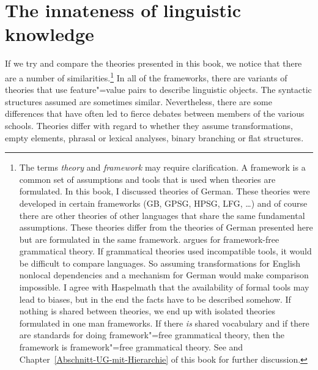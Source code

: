 %

\chapter{The innateness of linguistic knowledge}
\label{Abschnitt-Angeborenheit}\label{chap-innateness}
%


If we try and compare the theories presented in this book, we notice
that there are a number of similarities.\footnote{
  The terms \emph{theory} and \emph{framework} may require clarification. A framework is a common
  set of assumptions and tools that is used when theories are formulated. In this book, I discussed
  theories of German. These theories were developed in certain frameworks (GB, GPSG, HPSG, LFG, \ldots) and of course there are
  other theories of other languages that share the same fundamental assumptions. These theories
  differ from the theories of German presented here but are formulated in the same
  framework. \citet{Haspelmath2010c} argues for framework-free grammatical theory. If grammatical
  theories used incompatible tools, it would be difficult to compare languages. So assuming
  transformations for English nonlocal dependencies and a \slasch mechanism for German would make
  comparison impossible. I agree with Haspelmath that the availability of formal tools may lead to
  biases, but in the end the facts have to be described somehow. If nothing is shared between
  theories, we end up with isolated theories formulated in one man frameworks. If there \emph{is} shared
  vocabulary and if there are standards for doing framework"=free grammatical theory, then the
  framework is framework"=free grammatical theory. See
  \citet{MuellerCoreGram} and Chapter~\ref{Abschnitt-UG-mit-Hierarchie} of this book for further discussion.
}
In all of the frameworks, there are variants of theories that use feature"=value pairs to describe linguistic objects.
The syntactic structures assumed are sometimes similar. Nevertheless, there are some differences that have often led to fierce debates
between members of the various schools. Theories differ with regard to whether they assume transformations, empty elements, phrasal or lexical analyses,
binary branching or flat structures.

